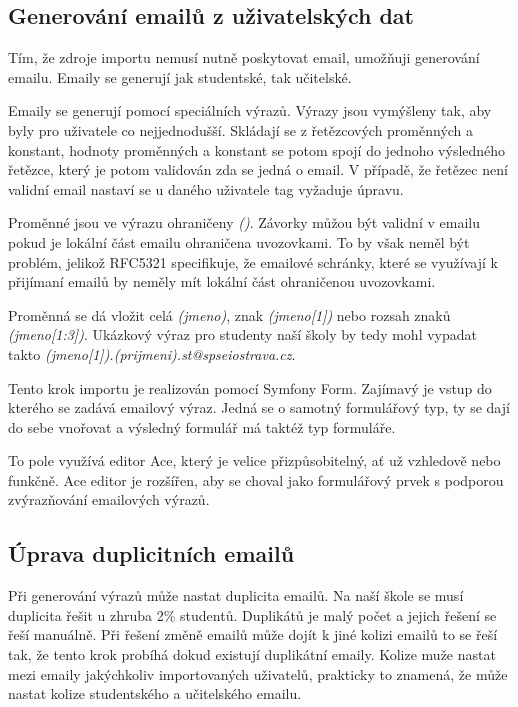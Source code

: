 \subsection{Generování emailů z uživatelských dat}

Tím, že zdroje importu nemusí nutně poskytovat email, umožňuji generování emailu.
Emaily se generují jak studentské, tak učitelské.

Emaily se generují pomocí speciálních výrazů.
Výrazy jsou vymýšleny tak, aby byly pro uživatele co nejjednodušší.
Skládají se z řetězcových proměnných a konstant, hodnoty proměnných a konstant se potom spojí do jednoho výsledného řetězce, který je potom validován zda se jedná o email. V případě, že řetězec není validní email nastaví se u daného uživatele tag vyžaduje úpravu. 

Proměnné jsou ve výrazu ohraničeny \textit{()}. Závorky můžou být validní v emailu pokud je lokální část emailu ohraničena uvozovkami\cite{wiki-email-address}. To by však neměl být problém, jelikož RFC5321 specifikuje, že emailové schránky, které se využívají k přijímaní  emailů by neměly mít lokální část ohraničenou uvozovkami\cite{rfc5321}.

Proměnná se dá vložit celá \textit{(jmeno)}, znak \textit{(jmeno[1])} nebo rozsah znaků \textit{(jmeno[1:3])}.
Ukázkový výraz pro studenty naší školy by tedy mohl vypadat takto \textit{(jmeno[1]).(prijmeni).st@spseiostrava.cz}.

Tento krok importu je realizován pomocí Symfony Form. Zajímavý je vstup do kterého se zadává emailový výraz. Jedná se o samotný formulářový typ, ty se dají do sebe vnořovat a výsledný formulář má taktéž typ formuláře. 

To pole využívá editor Ace, který je velice přizpůsobitelný, ať už vzhledově nebo funkčně. Ace editor je rozšířen, aby se choval jako formulářový prvek s podporou zvýrazňování emailových výrazů.

\subsection{Úprava duplicitních emailů}\label{postup:deduplikace-emailu}

Při generování výrazů může nastat duplicita emailů.
Na naší škole se musí duplicita řešit u zhruba 2\% studentů.
Duplikátů je malý počet a jejich řešení se řeší manuálně.
Při řešení změně emailů může dojít k jiné kolizi emailů to se řeší tak, že tento krok probíhá dokud existují duplikátní emaily. Kolize muže nastat mezi emaily jakýchkoliv importovaných uživatelů, prakticky to znamená, že může nastat kolize studentského a učitelského emailu.

